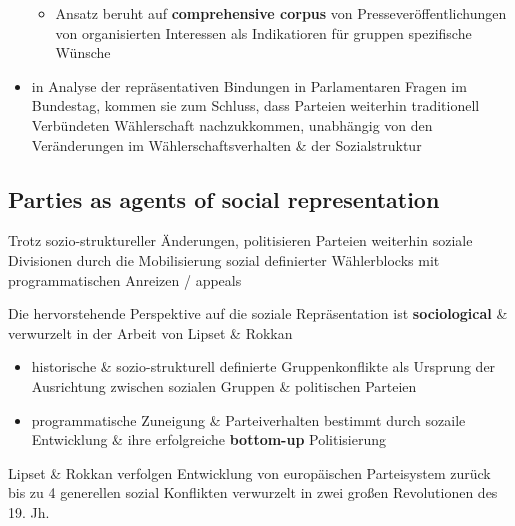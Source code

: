 \documentclass[11pt]{article}
\begin{document}
\begin{itemize}
\begin{itemize}
\item Ansatz beruht auf \textbf{comprehensive corpus} von Presseveröffentlichungen von organisierten Interessen als Indikatioren für gruppen spezifische Wünsche
\end{itemize}
\item in Analyse der repräsentativen Bindungen in Parlamentaren Fragen im Bundestag, kommen sie zum Schluss, dass Parteien weiterhin traditionell Verbündeten Wählerschaft nachzukkommen, unabhängig von den Veränderungen im Wählerschaftsverhalten \& der Sozialstruktur
\end{itemize}

\subsection{Parties as agents of social representation}
\label{sec:orgca9eb6a}

Trotz sozio-struktureller Änderungen, politisieren Parteien weiterhin soziale Divisionen durch die Mobilisierung sozial definierter Wählerblocks mit programmatischen Anreizen / appeals 

Die hervorstehende Perspektive auf die soziale Repräsentation ist \textbf{sociological} \& verwurzelt in der Arbeit von Lipset \& Rokkan 

\begin{itemize}
\item historische \& sozio-strukturell definierte Gruppenkonflikte als Ursprung der Ausrichtung zwischen sozialen Gruppen \& politischen Parteien
\item programmatische Zuneigung \& Parteiverhalten bestimmt durch sozaile Entwicklung \& ihre erfolgreiche \textbf{bottom-up} Politisierung
\end{itemize}

Lipset \& Rokkan verfolgen Entwicklung von europäischen Parteisystem zurück bis zu 4 generellen sozial Konflikten verwurzelt in zwei großen Revolutionen des 19. Jh. 
\end{document}
